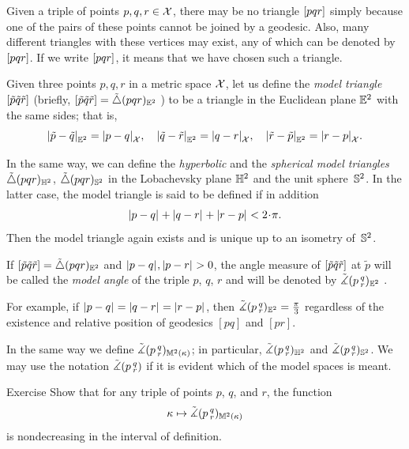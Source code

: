 Given a triple of points $p,q,r\in \mathcal{X}$, there may be no triangle
$[pqr]$ simply because one of the pairs of these points cannot be joined by a geodesic.
Also, many different triangles with these vertices may exist, any of which can be denoted by $[pqr]$.
If we write $[pqr]$, it means that we have chosen such a triangle.


Given three points $p,q,r$ in a metric space $\mathcal{X}$,
let us define the \emph{model triangle} $[\tilde p\tilde q\tilde r]$ 
(briefly, 
$[\tilde p\tilde q\tilde r]=\tilde\triangle(p q r)_{\mathbb{E}^2}$%
) to be a triangle in the Euclidean plane $\mathbb{E}^2$ with the same sides;
that is,
\[
\dist{\tilde p}{\tilde q}{\EE^2}=\dist{p}{q}{\spc{X}},
\quad\dist{\tilde q}{\tilde r}{\EE^2}=\dist{q}{r}{\spc{X}},
\quad\dist{\tilde r}{\tilde p}{\EE^2}=\dist{r}{p}{\spc{X}}.
\]

In the same way, we can define the \emph{hyperbolic} and the \emph{spherical model triangles} $\tilde\triangle(p q r)_{\mathbb{H}^2}$, $\tilde\triangle(p q r)_{\mathbb{S}^2}$
in the Lobachevsky plane $\mathbb{H}^2$ and the unit sphere~$\mathbb{S}^2$.
In the latter case, the model triangle is said to be defined if in addition
\[\dist{p}{q}{}+\dist{q}{r}{}+\dist{r}{p}{}< 2\cdot\pi.\]
Then the model triangle again exists and is unique up to an isometry of~$\mathbb{S}^2$.

If 
$[\tilde p\tilde q\tilde r]=\tilde\triangle(p q r)_{\mathbb{E}^2}$ 
and $\dist{p}{q}{},\dist{p}{r}{}>0$, 
the angle measure of 
$[\tilde p\tilde q\tilde r]$ at $\tilde p$ 
will be called the \emph{model angle} of the triple $p$, $q$, $r$ and will be denoted by
$\tilde\measuredangle(p\,{}^{q}_{r})_{\mathbb{E}^2}$%
.\label{page:model-angle}

For example, if $\dist{p}{q}{}=\dist{q}{r}{}=\dist{r}{p}{}$, then $\tilde\measuredangle(p\,{}^{q}_{r})_{\mathbb{E}^2}=\tfrac\pi3$ regardless of the existence and relative position of geodesics $[pq]$ and $[pr]$.

In the same way we define $\tilde\measuredangle(p\,{}^{q}_{r})_{\mathbb{M}^2(\kappa)}$;
in particular, $\tilde\measuredangle(p\,{}^{q}_{r})_{\mathbb{H}^2}$ and $\tilde\measuredangle(p\,{}^{q}_{r})_{\mathbb{S}^2}$.
We may use the notation $\tilde\measuredangle(p\,{}^{q}_{r})$ if it is evident which of the model spaces is meant.

\begin{thm}[!]{Exercise}\label{ex:k-><mono}
Show that for any triple of points $p$, $q$, and $r$,
the function
\[\kappa\mapsto \tilde\measuredangle(p\,{}^{q}_{r})_{\mathbb{M}^2(\kappa)}\]
is nondecreasing in the interval of definition.
\end{thm}


